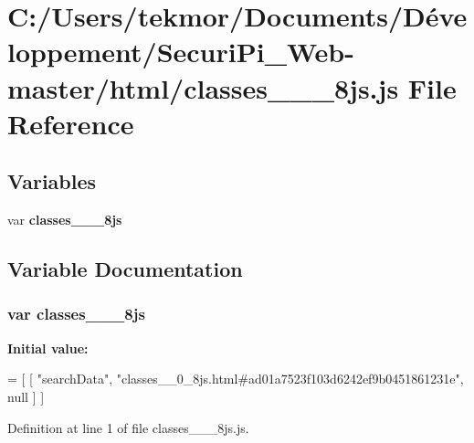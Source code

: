 \section{C\+:/\+Users/tekmor/\+Documents/\+Développement/\+Securi\+Pi\+\_\+\+Web-\/master/html/classes\+\_\+\+\_\+\_\+8js.js File Reference}
\label{classes____0__8js_8js}
\subsection*{Variables}
\begin{DoxyCompactItemize}
\item 
var {\bf classes\+\_\+\+\_\+\_\+8js}
\end{DoxyCompactItemize}


\subsection{Variable Documentation}
\subsubsection[{classes\+\_\+\+\_\+0\+\_\+8js}]{\setlength{\rightskip}{0pt plus 5cm}var classes\+\_\+\+\_\+\_\+8js}\label{classes____0__8js_8js_aa18f811c18c4d0b2af968c94d162c3e0}
{\bfseries Initial value\+:}
\begin{DoxyCode}
=
[
    [ \textcolor{stringliteral}{"searchData"}, \textcolor{stringliteral}{"classes\_\_0\_8js.html#ad01a7523f103d6242ef9b0451861231e"}, null ]
]
\end{DoxyCode}


Definition at line 1 of file classes\+\_\+\+\_\+\_\+8js.\+js.

